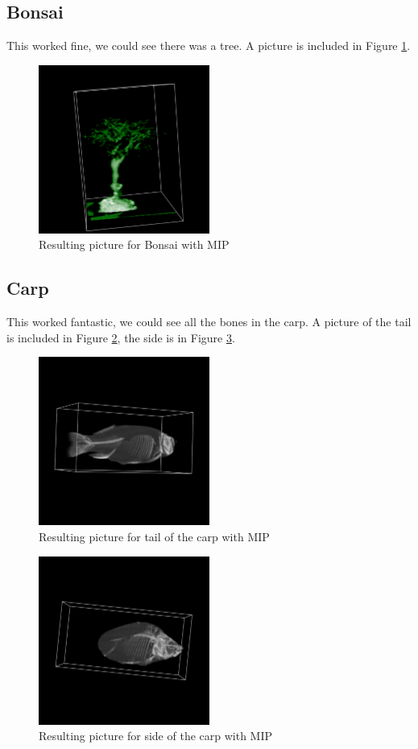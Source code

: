 \documentclass[a4paper,twoside,11pt]{article}
\begin{document}
\subsection{Bonsai}
This worked fine, we could see there was a tree. A picture is included in Figure \ref{MBon}.
\begin{figure}[!h]
  \centering
  \includegraphics[width=0.5\textwidth]{MBon.png}
  \caption{Resulting picture for Bonsai with MIP}
  \label{MBon}
\end{figure}
\subsection{Carp}
This worked fantastic, we could see all the bones in the carp. A picture of the tail is included in Figure \ref{MCT}, the side is in Figure \ref{MCS}.
\begin{figure}[!h]
  \centering
  \includegraphics[width=0.5\textwidth]{MCT.png}
  \caption{Resulting picture for tail of the carp with MIP}
  \label{MCT}
\end{figure}
\begin{figure}[!h]
  \centering
  \includegraphics[width=0.5\textwidth]{MCS.png}
  \caption{Resulting picture for side of the carp with MIP}
  \label{MCS}
\end{figure}
\end{document}
